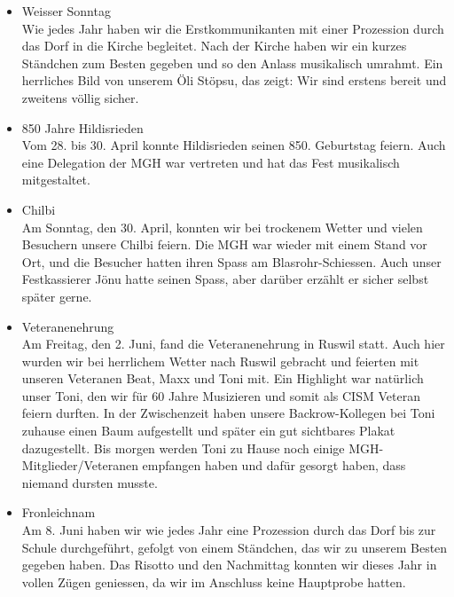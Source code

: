\begin{history}
\begin{itemize}
            \item  Weisser Sonntag\\
                  Wie jedes Jahr haben wir die Erstkommunikanten mit einer
                  Prozession durch das Dorf in die Kirche begleitet. Nach der
                  Kirche haben wir ein kurzes Ständchen zum Besten gegeben und
                  so den Anlass musikalisch umrahmt. Ein herrliches Bild von
                  unserem Öli Stöpsu, das zeigt: Wir sind erstens bereit und
                  zweitens völlig sicher.

            \item 850 Jahre Hildisrieden\\
                  Vom 28. bis 30. April konnte Hildisrieden seinen 850.
                  Geburtstag feiern. Auch eine Delegation der MGH war vertreten
                  und hat das Fest musikalisch mitgestaltet.

            \item  Chilbi\\
                  Am Sonntag, den 30. April, konnten wir bei trockenem Wetter
                  und vielen Besuchern unsere Chilbi feiern. Die MGH war wieder
                  mit einem Stand vor Ort, und die Besucher hatten ihren Spass
                  am Blasrohr-Schiessen. Auch unser Festkassierer Jönu hatte
                  seinen Spass, aber darüber erzählt er sicher selbst später
                  gerne.

            \item Veteranenehrung\\
                  Am Freitag, den 2. Juni, fand die Veteranenehrung in Ruswil
                  statt. Auch hier wurden wir bei herrlichem Wetter nach Ruswil
                  gebracht und feierten mit unseren Veteranen Beat, Maxx und
                  Toni mit. Ein Highlight war natürlich unser Toni, den wir für
                  60 Jahre Musizieren und somit als CISM Veteran feiern durften.
                  In der Zwischenzeit haben unsere Backrow-Kollegen bei Toni
                  zuhause einen Baum aufgestellt und später ein gut sichtbares
                  Plakat dazugestellt. Bis morgen werden Toni zu Hause noch
                  einige MGH-Mitglieder/Veteranen empfangen haben und dafür
                  gesorgt haben, dass niemand dursten musste.

            \item Fronleichnam\\
                  Am 8. Juni haben wir wie jedes Jahr eine Prozession durch das
                  Dorf bis zur Schule durchgeführt, gefolgt von einem Ständchen,
                  das wir zu unserem Besten gegeben haben. Das Risotto und den
                  Nachmittag konnten wir dieses Jahr in vollen Zügen geniessen,
                  da wir im Anschluss keine Hauptprobe hatten.


\end{itemize}
\end{history}
